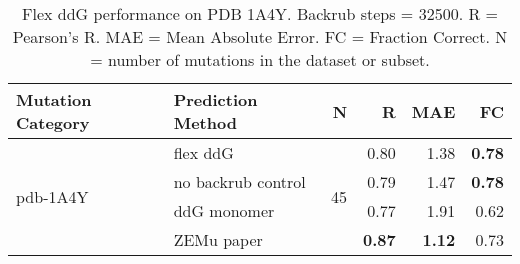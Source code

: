 \begin{table}
  \begin{tabular}{llrrrr}
\toprule
Mutation Category &   Prediction Method &   N &    R &  MAE &   FC \\
\midrule
 \multirow{ 4}{*}{pdb-1A4Y} & flex ddG & \multirow{ 4}{*}{45} & 0.80 & 1.38 & \textbf{0.78}  \\
 & no backrub control & & 0.79 & 1.47 & \textbf{0.78}  \\
 & ddG monomer & & 0.77 & 1.91 & 0.62  \\
 & ZEMu paper & & \textbf{0.87} & \textbf{1.12} & 0.73  \\
\bottomrule
\end{tabular}
  \caption[Flex ddG performance on PDB 1A4Y]{
    Flex ddG performance on PDB 1A4Y. Backrub steps = 32500. R = Pearson's R. MAE = Mean Absolute Error. FC = Fraction Correct. N = number of mutations in the dataset or subset.
  } \label{tab:table-pdb-1A4Y}
\end{table}
